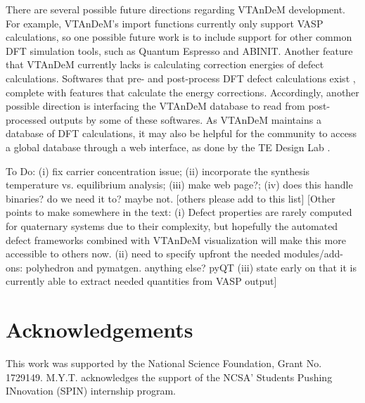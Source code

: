 \documentclass[%
 reprint,
 amsmath,amssymb,
 aps,
]{revtex4-1}
\def\blue#1{\textcolor[rgb]{0,0,1}{#1}}
\def\red#1{\textcolor[rgb]{1,0,0}{#1}}
\begin{document}
There are several possible future directions regarding VTAnDeM development. For example, VTAnDeM's import functions currently only support VASP calculations, so one possible future work is to include support for other common DFT simulation tools, such as Quantum Espresso and ABINIT. Another feature that VTAnDeM currently lacks is calculating correction energies of defect calculations. Softwares that pre- and post-process DFT defect calculations exist \cite{2017_Goyal, 2018_Broberg, 2018_Naik}, complete with features that calculate the energy corrections. Accordingly, another possible direction is interfacing the VTAnDeM database to read from post-processed outputs by some of these softwares. As VTAnDeM maintains a database of DFT calculations, it may also be helpful for the community to access a global database through a web interface, as done by the TE Design Lab \cite{2016_Gorai}.

\red{To Do: (i) fix carrier concentration issue; (ii) incorporate the synthesis temperature vs. equilibrium analysis; (iii) make web page?; (iv) does this handle binaries?  do we need it to?  maybe not. [others please add to this list]} \blue{[Other points to make somewhere in the text: (i) Defect properties are rarely computed for quaternary systems due to their complexity, but hopefully the automated defect frameworks combined with VTAnDeM visualization will make this more accessible to others now. (ii) need to specify upfront the needed modules/add-ons: polyhedron and pymatgen. anything else? pyQT (iii) state early on that it is currently able to extract needed quantities from VASP output]}


\section*{Acknowledgements} 
This work was supported by the National Science Foundation, Grant No. 1729149. 
M.Y.T. acknowledges the support of the NCSA' Students Pushing INnovation (SPIN) internship program.




\end{document}
